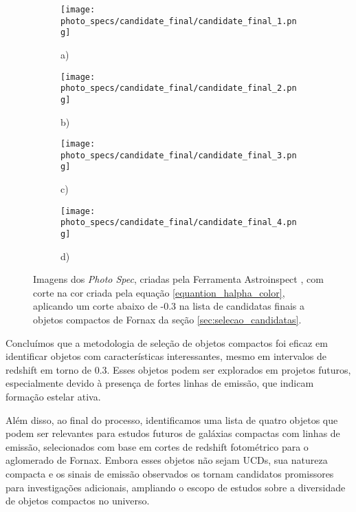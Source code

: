 \begin{figure}[!ht]
    \centering
    \captionsetup{justification=centering}
    \begin{subfigure}[b]{0.45\textwidth}
        \texttt{[image: photo\_specs/candidate\_final/candidate\_final\_1.png]}
        \caption{a)}
    \end{subfigure}
    \begin{subfigure}[b]{0.45\textwidth}
        \texttt{[image: photo\_specs/candidate\_final/candidate\_final\_2.png]}
        \caption{b)}
    \end{subfigure}
    \begin{subfigure}[b]{0.45\textwidth}
        \texttt{[image: photo\_specs/candidate\_final/candidate\_final\_3.png]}
        \caption{c)}
    \end{subfigure}
    \begin{subfigure}[b]{0.45\textwidth}
        \texttt{[image: photo\_specs/candidate\_final/candidate\_final\_4.png]}
        \caption{d)}
    \end{subfigure}
    \caption{Imagens dos \textit{Photo Spec}, criadas pela Ferramenta Astroinspect \cite{astroinspect}, com corte na cor criada pela equação \ref{equantion_halpha_color}, aplicando um corte abaixo de -0.3 na lista de candidatas finais a objetos compactos de Fornax da seção \ref{sec:selecao_candidatas}.}
    \label{halpha_candidatas_final}
\end{figure}

Concluímos que a metodologia de seleção de objetos compactos foi eficaz em identificar objetos com características interessantes, mesmo em intervalos de redshift em torno de 0.3. Esses objetos podem ser explorados em projetos futuros, especialmente devido à presença de fortes linhas de emissão, que indicam formação estelar ativa.

Além disso, ao final do processo, identificamos uma lista de quatro objetos que podem ser relevantes para estudos futuros de galáxias compactas com linhas de emissão, selecionados com base em cortes de redshift fotométrico para o aglomerado de Fornax. Embora esses objetos não sejam UCDs, sua natureza compacta e os sinais de emissão observados os tornam candidatos promissores para investigações adicionais, ampliando o escopo de estudos sobre a diversidade de objetos compactos no universo.

